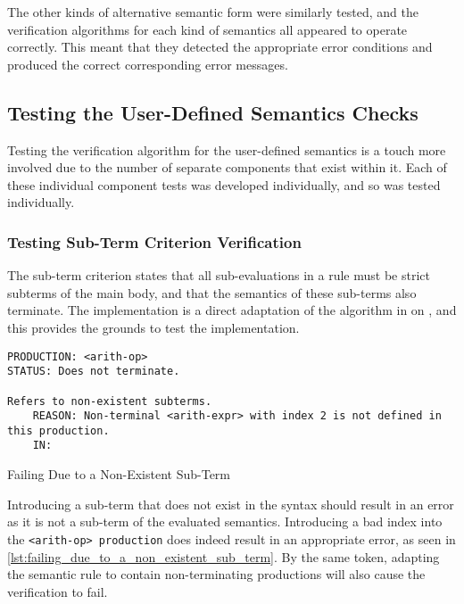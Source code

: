 The other kinds of alternative semantic form were similarly tested, and the verification algorithms for each kind of semantics all appeared to operate correctly.
This meant that they detected the appropriate error conditions and produced the correct corresponding error messages.


\subsection{Testing the User-Defined Semantics Checks} %
\label{sub:testing_the_user_defined_semantics_checks}
Testing the verification algorithm for the user-defined semantics is a touch more involved due to the number of separate components that exist within it. 
Each of these individual component tests was developed individually, and so was tested individually. 

\subsubsection{Testing Sub-Term Criterion Verification} %
\label{ssub:testing_sub_term_criterion_verification}
The sub-term criterion states that all sub-evaluations in a rule must be strict subterms of the main body, and that the semantics of these sub-terms also terminate. 
The implementation is a direct adaptation of the algorithm in  on , and this provides the grounds to test the implementation.

\begin{listing}[!htb]
\begin{verbatim}
PRODUCTION: <arith-op>
STATUS: Does not terminate.

Refers to non-existent subterms.
    REASON: Non-terminal <arith-expr> with index 2 is not defined in this production.
    IN:
\end{verbatim}
\caption{Failing Due to a Non-Existent Sub-Term}
\label{lst:failing_due_to_a_non_existent_sub_term}
\end{listing}

Introducing a sub-term that does not exist in the syntax should result in an error as it is not a sub-term of the evaluated semantics.
Introducing a bad index into the \texttt{<arith-op> production} does indeed result in an appropriate error, as seen in \autoref{lst:failing_due_to_a_non_existent_sub_term}.
By the same token, adapting the semantic rule to contain non-terminating productions will also cause the verification to fail.

